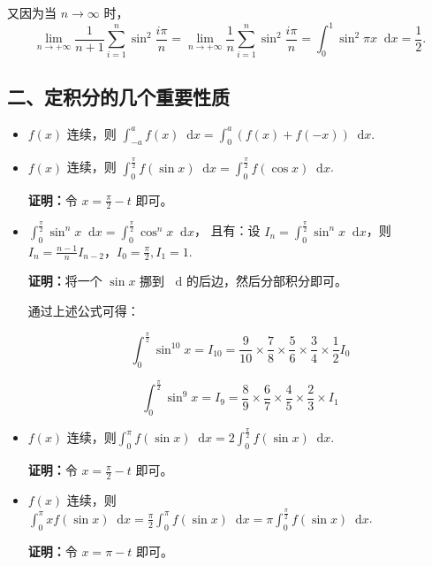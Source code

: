 \documentclass[a5paper]{ctexart}
\renewcommand{\d}{\mathop{}\!\mathrm{d}}
\begin{document}
	又因为当 $n \to \infty$ 时，
	\begin{equation*}
		\lim\limits_{n \to +\infty} \frac{1}{n + 1} \sum_{i = 1}^{n} \sin ^2 \frac{i \pi}{n} =\lim\limits_{n \to +\infty}  \frac{1}{n} \sum_{i = 1}^{n} \sin ^2 \frac{i \pi}{n} = \int_{0}^{1} \sin^2 \pi x \d x = \frac{1}{2}.
	\end{equation*}
	\subsection*{二、定积分的几个重要性质}
	
	\begin{itemize}
		\item $f(x)$ 连续，则 $\int_{-a}^{a} f(x) \d x = \int_{0}^{a} (f(x) + f(-x)) \d x$.
		
		\item $f(x)$ 连续，则 $\int_{0}^{\frac{\pi}{2}} f(\sin x) \d x = \int_{0}^{\frac{\pi}{2}} f(\cos x) \d x$.
		
		\textbf{证明：}令 $x = \frac{\pi}{2} - t$ 即可。
		\item $\int_{0}^{\frac{\pi}{2}} \sin^n x \d x = \int_{0}^{\frac{\pi}{2}} \cos^n x \d x$，
		且有：设 $I_n = \int_{0}^{\frac{\pi}{2}} \sin^n x \d x$，则 $I_n = \frac{n - 1}{n} I_{n - 2}$，$I_0 = \frac{\pi}{2}, I_1 = 1$.\
		
		\textbf{证明：}将一个 $\sin x$ 挪到 $\d$ 的后边，然后分部积分即可。
		
		通过上述公式可得：
		
		\begin{equation*}
			\int_{0}^{\frac{\pi}{2}} \sin^{10} x =  I_{10} = \frac{9}{10}\times \frac{7}{8}\times \frac{5}{6}\times \frac{3}{4}\times \frac{1}{2} I_0  
		\end{equation*}
		
		\begin{equation*}
			\int_{0}^{\frac{\pi}{2}} \sin^{9} x =  I_{9} = \frac{8}{9}\times \frac{6}{7}\times \frac{4}{5}\times \frac{2}{3}\times I_1
		\end{equation*}
		
		\item $f(x)$ 连续，则$\int_{0}^{\pi} f(\sin x) \d x = 2 \int_{0}^{\frac{\pi}{2}} f(\sin x) \d x $.
		
		\textbf{证明：}令 $x = \frac{\pi}{2} - t$ 即可。
		
		\item $f(x)$ 连续，则$\int_{0}^{\pi} x f(\sin x) \d x= \frac{\pi}{2} \int_{0}^{\pi}  f(\sin x) \d x = \pi \int_{0}^{\frac{\pi}{2}}  f(\sin x) \d x$.
		
		\textbf{证明：}令 $x = \pi - t$ 即可。
		
	\end{itemize}
	
\end{document}
